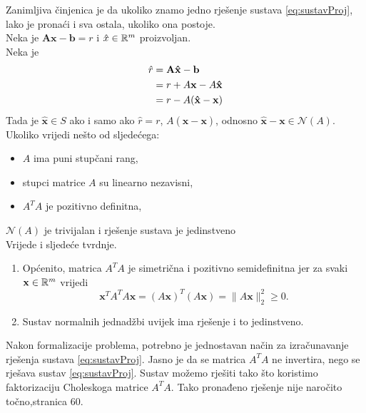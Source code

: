 \documentclass[a4paper,twoside,12pt]{memoir} %
\begin{document}
Zanimljiva činjenica je da 
ukoliko znamo jedno rješenje sustava \ref{eq:sustavProj}, lako je pronaći i sva ostala, ukoliko ona postoje.\\
Neka je $\mathbf{A}\mathbf{x} - \mathbf{b} = r$ i $\hat{x} \in \mathbb{R}^m$ proizvoljan.\\
Neka je
\begin{align}
\hat{r}  &=  \mathbf{A}\mathbf{\hat{x}} - \mathbf{b} \notag \\
&= r + A\mathbf{x} - A\mathbf{\hat{x}} \notag \\
&= r - A(\mathbf{\hat{x}} - \mathbf{x}) \notag
\end{align}
Tada je $\mathbf{\hat{x}} \in S$ ako i samo ako $\hat{r} = r$,  $ A(\mathbf{\hat{x}} - \mathbf{x}) $, odnosno $\mathbf{\hat{x}} - \mathbf{x} \in \mathcal{N}(A)$.\\
Ukoliko vrijedi nešto od sljedećega:
\begin{itemize}
	\item $A$ ima puni stupčani rang,
	\item stupci matrice $A$ su linearno nezavisni,
	\item $A^TA$ je pozitivno definitna,
\end{itemize}
$\mathcal{N}(A)$ je trivijalan i rješenje sustava je jedinstveno 
\vspace{0.5cm}
\\Vrijede i sljedeće tvrdnje.%
\begin{enumerate}
	\item Općenito, matrica $A^TA$ je simetrična i pozitivno semidefinitna jer za svaki
	$\mathbf{x} \in \mathbb{R}^m$ vrijedi
	$$  \mathbf{x}^TA^TA\mathbf{x} = (A\mathbf{x})^T(A\mathbf{x}) = \|A\mathbf{x}\|_2^2 \geq 0. $$
	\item Sustav normalnih jednadžbi uvijek ima rješenje i to jedinstveno.
\end{enumerate}
\vspace{1cm}
Nakon formalizacije problema, potrebno je jednostavan način za izračunavanje rješenja sustava \ref{eq:sustavProj}.
Jasno je da se matrica $A^TA$ ne invertira, nego se rješava sustav \ref{eq:sustavProj}.
Sustav možemo rješiti tako što koristimo faktorizaciju Choleskoga matrice $A^TA$.
Tako pronađeno rješenje nije naročito točno\cite{singer07},stranica 60.\\
\end{document}
